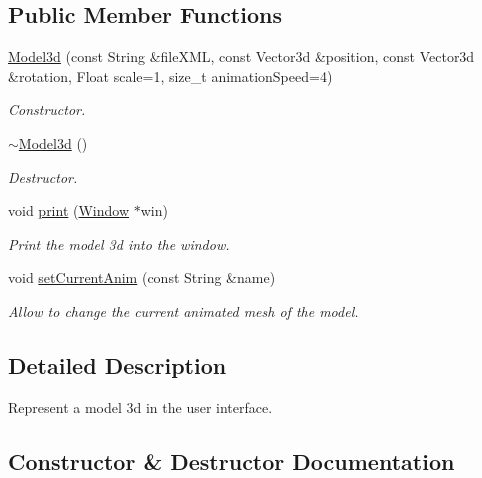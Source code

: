 \subsection*{Public Member Functions}
\begin{DoxyCompactItemize}
\item 
\hyperlink{classModel3d_a3382c1519f85b695a1d98b492207c339}{Model3d} (const String \&file\+X\+ML, const Vector3d \&position, const Vector3d \&rotation, Float scale=1, size\+\_\+t animation\+Speed=4)
\begin{DoxyCompactList}\small\item\em Constructor. \end{DoxyCompactList}\item 
\hyperlink{classModel3d_a7a4ec3be34c901538574d99d95a46b04}{$\sim$\+Model3d} ()
\begin{DoxyCompactList}\small\item\em Destructor. \end{DoxyCompactList}\item 
void \hyperlink{classModel3d_ae02d86ac82ec9f435cf1ebe668f3a6dd}{print} (\hyperlink{classWindow}{Window} $\ast$win)
\begin{DoxyCompactList}\small\item\em Print the model 3d into the window. \end{DoxyCompactList}\item 
void \hyperlink{classModel3d_a29eeaa6769b0c21268f4704ac2d404b7}{set\+Current\+Anim} (const String \&name)
\begin{DoxyCompactList}\small\item\em Allow to change the current animated mesh of the model. \end{DoxyCompactList}\end{DoxyCompactItemize}


\subsection{Detailed Description}
Represent a model 3d in the user interface. 

\subsection{Constructor \& Destructor Documentation}
\mbox{\label{classModel3d_a3382c1519f85b695a1d98b492207c339}} 
